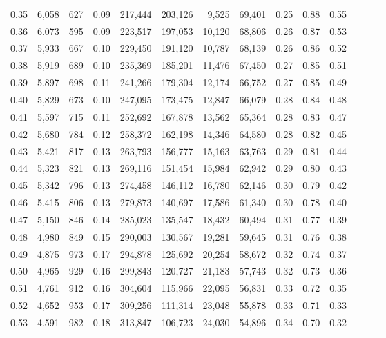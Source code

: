 \begin{tabular}{rrrrrrrrrrrrrr}
0.35 &  6,058 &    627 &  0.09 &  217,444 &  203,126 &   9,525 &  69,401 &  0.25 &  0.88 &      0.55 \\
0.36 &  6,073 &    595 &  0.09 &  223,517 &  197,053 &  10,120 &  68,806 &  0.26 &  0.87 &      0.53 \\
0.37 &  5,933 &    667 &  0.10 &  229,450 &  191,120 &  10,787 &  68,139 &  0.26 &  0.86 &      0.52 \\
0.38 &  5,919 &    689 &  0.10 &  235,369 &  185,201 &  11,476 &  67,450 &  0.27 &  0.85 &      0.51 \\
0.39 &  5,897 &    698 &  0.11 &  241,266 &  179,304 &  12,174 &  66,752 &  0.27 &  0.85 &      0.49 \\
0.40 &  5,829 &    673 &  0.10 &  247,095 &  173,475 &  12,847 &  66,079 &  0.28 &  0.84 &      0.48 \\
0.41 &  5,597 &    715 &  0.11 &  252,692 &  167,878 &  13,562 &  65,364 &  0.28 &  0.83 &      0.47 \\
0.42 &  5,680 &    784 &  0.12 &  258,372 &  162,198 &  14,346 &  64,580 &  0.28 &  0.82 &      0.45 \\
0.43 &  5,421 &    817 &  0.13 &  263,793 &  156,777 &  15,163 &  63,763 &  0.29 &  0.81 &      0.44 \\
0.44 &  5,323 &    821 &  0.13 &  269,116 &  151,454 &  15,984 &  62,942 &  0.29 &  0.80 &      0.43 \\
0.45 &  5,342 &    796 &  0.13 &  274,458 &  146,112 &  16,780 &  62,146 &  0.30 &  0.79 &      0.42 \\
0.46 &  5,415 &    806 &  0.13 &  279,873 &  140,697 &  17,586 &  61,340 &  0.30 &  0.78 &      0.40 \\
0.47 &  5,150 &    846 &  0.14 &  285,023 &  135,547 &  18,432 &  60,494 &  0.31 &  0.77 &      0.39 \\
0.48 &  4,980 &    849 &  0.15 &  290,003 &  130,567 &  19,281 &  59,645 &  0.31 &  0.76 &      0.38 \\
0.49 &  4,875 &    973 &  0.17 &  294,878 &  125,692 &  20,254 &  58,672 &  0.32 &  0.74 &      0.37 \\
0.50 &  4,965 &    929 &  0.16 &  299,843 &  120,727 &  21,183 &  57,743 &  0.32 &  0.73 &      0.36 \\
0.51 &  4,761 &    912 &  0.16 &  304,604 &  115,966 &  22,095 &  56,831 &  0.33 &  0.72 &      0.35 \\
0.52 &  4,652 &    953 &  0.17 &  309,256 &  111,314 &  23,048 &  55,878 &  0.33 &  0.71 &      0.33 \\
0.53 &  4,591 &    982 &  0.18 &  313,847 &  106,723 &  24,030 &  54,896 &  0.34 &  0.70 &      0.32 \\

\end{tabular}
